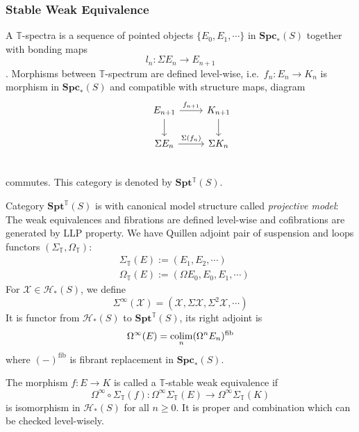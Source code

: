 \documentclass[b5paper,10pt]{article}
\begin{document}
\subsubsection{Stable Weak Equivalence}
\begin{secdefn}
	A $\mathbb{T}$-spectra is a sequence of pointed objects $\{ E_0, E_1 ,\cdots\}$ in $\mathbf{Spc}_*(S)$ together with bonding maps
	\[
	l_n \colon \Sigma E_{n} \to  E_{n+1}
	\].	
	Morphisms between $\mathbb{T}$-spectrum are defined level-wise, i.e.\ $f_n \colon E_n \to K_n$ is morphism in $\mathbf{Spc}_*(S)$ and compatible with structure maps, diagram
	\[
	\begin{tikzcd}
	&E_{n+1} \ar[r,"f_{n+1}"] \ar[d]& K_{n+1} \ar[d]\\
	&\Sigma E_{n} \ar[r,"\Sigma (f_{n})"] & \Sigma K_{n}\\
	\end{tikzcd}
	\]
	commutes.
	 This category is denoted by $\mathbf{Spt^{\mathbb{T}}}(S)$.
\end{secdefn}
Category $\mathbf{Spt^{\mathbb{T}}}(S)$ is with canonical model structure called \emph{projective model}: The weak equivalences and fibrations are defined level-wise and cofibrations are generated by LLP property. We have Quillen adjoint pair of suspension and loops functors $(\Sigma_\mathbb{T}, \Omega_\mathbb{T})$:
\[
\begin{aligned}
&\Sigma_\mathbb{T}(E) := (E_1, E_2 ,\cdots)\\
&\Omega_{\mathbb{T}}(E) := (\Omega E_0, E_0, E_1,\cdots)
\end{aligned}
\]
For $\mathcal{X} \in \mathcal{H}_*(S)$, we define
\[
\Sigma^{\infty}(\mathcal{X}) = (\mathcal{X} , \Sigma \mathcal{X}, \Sigma^2 \mathcal{X}, \cdots)\]
It is functor from $\mathcal{H}_*(S)$ to $\mathbf{Spt}^{\mathbb{T}}(S)$, its right adjoint is 
\[
\Omega^{\infty}(E)= \operatorname*{colim}_n( \Omega^n E_n)^{\text{fib}}
\]
where $(-)^{\text{fib}}$ is fibrant replacement in $\mathbf{Spc}_*(S)$.
\begin{secdefn}
	The morphism $f \colon E \to K$ is called a $\mathbb{T}$-stable weak equivalence if 
	\[
	\Omega^{\infty}\circ \Sigma_{\mathbb{T}} (f) \colon \Omega^{\infty} \Sigma_{\mathbb{T}}(E) \to \Omega^{\infty} \Sigma_{\mathbb{T}}(K)
	\]
	is isomorphism in $\mathcal{H}_*(S)$ for all $n \geq 0$. It is proper and combination which can be checked level-wisely.
\end{secdefn}
\end{document}
